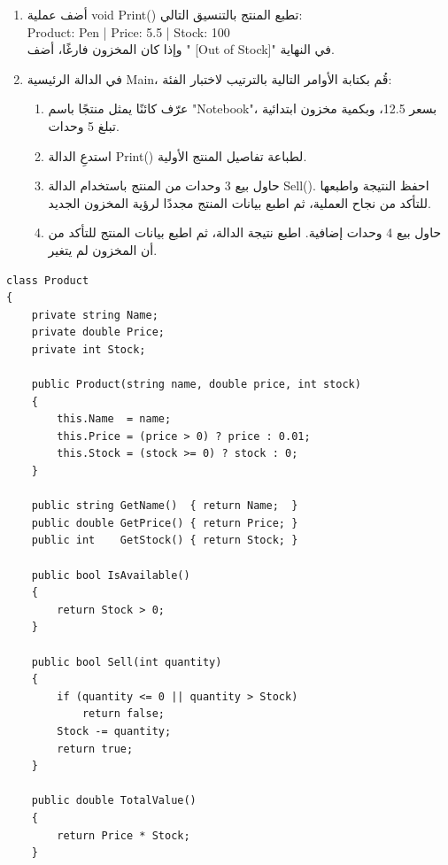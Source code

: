 \documentclass[14pt]{extarticle}
\begin{document}
\begin{enumerate}[itemsep=2em]
\begin{enumerate}[itemsep=1em]
    \item أضف عملية \textenglish{void Print()} تطبع المنتج بالتنسيق التالي: \\
    \textenglish{Product: Pen | Price: 5.5 | Stock: 100} \\
    وإذا كان المخزون فارغًا، أضف \textenglish{" [Out of Stock]"} في النهاية.

    \item في الدالة الرئيسية \textenglish{Main}، قُم بكتابة الأوامر التالية بالترتيب لاختبار الفئة:
    \begin{enumerate}[itemsep=1pt, label=(\roman*)]
        \item عرّف كائنًا يمثل منتجًا باسم \textenglish{"Notebook"}، بسعر \textenglish{12.5}، وبكمية مخزون ابتدائية تبلغ 5 وحدات.
        \item استدعِ الدالة \textenglish{Print()} لطباعة تفاصيل المنتج الأولية.
        \item حاول بيع 3 وحدات من المنتج باستخدام الدالة \textenglish{Sell()}. احفظ النتيجة واطبعها للتأكد من نجاح العملية، ثم اطبع بيانات المنتج مجددًا لرؤية المخزون الجديد.
        \item حاول بيع 4 وحدات إضافية. اطبع نتيجة الدالة، ثم اطبع بيانات المنتج للتأكد من أن المخزون لم يتغير.
    \end{enumerate}
\end{enumerate}

\ifwithsols
{\small
\begin{boxSolution}
\begin{english}
\begin{verbatim}
class Product
{
    private string Name;
    private double Price;
    private int Stock;

    public Product(string name, double price, int stock)
    {
        this.Name  = name;
        this.Price = (price > 0) ? price : 0.01;
        this.Stock = (stock >= 0) ? stock : 0;
    }

    public string GetName()  { return Name;  }
    public double GetPrice() { return Price; }
    public int    GetStock() { return Stock; }

    public bool IsAvailable()
    {
        return Stock > 0;
    }

    public bool Sell(int quantity)
    {
        if (quantity <= 0 || quantity > Stock)
            return false;
        Stock -= quantity;
        return true;
    }

    public double TotalValue()
    {
        return Price * Stock;
    }


\end{verbatim}
\end{english}
\end{boxSolution}}
\end{enumerate}
\end{document}
